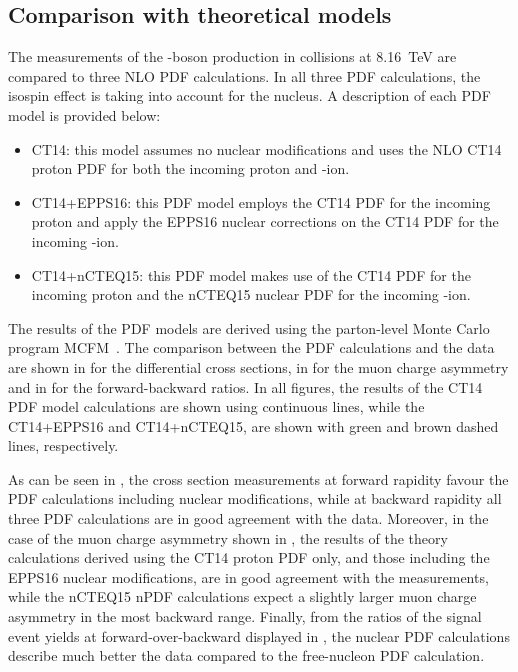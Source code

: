 \subsection{Comparison with theoretical models} \label{sec:WBoson_Results_ComparisonWithTheory}

The measurements of the \Wb-boson production in \RunpPb collisions at \SI{8.16}{\TeV} are compared to three NLO PDF calculations. In all three PDF calculations, the isospin effect is taking into account for the \Pb nucleus. A description of each PDF model is provided below:

\begin{itemize}

 \item CT14: this model assumes no nuclear modifications and uses the NLO CT14 proton PDF for both the incoming proton and \Pb-ion.

 \item CT14+EPPS16: this PDF model employs the CT14 PDF for the incoming proton and apply the EPPS16 nuclear corrections on the CT14 PDF for the incoming \Pb-ion.

 \item CT14+nCTEQ15: this PDF model makes use of the CT14 PDF for the incoming proton and the nCTEQ15 nuclear PDF for the incoming \Pb-ion.

\end{itemize}

The results of the PDF models are derived using the parton-level Monte Carlo program MCFM~\cite{MCFM}. The comparison between the PDF calculations and the data are shown in  for the \WToMuNu differential cross sections, in  for the muon charge asymmetry and in  for the forward-backward ratios. In all figures, the results of the CT14 PDF model calculations are shown using continuous lines, while the CT14+EPPS16 and CT14+nCTEQ15, are shown with green and brown dashed lines, respectively.

As can be seen in , the \WToMuNu cross section measurements at forward rapidity favour the PDF calculations including nuclear modifications, while at backward rapidity all three PDF calculations are in good agreement with the data. Moreover, in the case of the muon charge asymmetry shown in , the results of the theory calculations derived using the CT14 proton PDF only, and those including the EPPS16 nuclear modifications, are in good agreement with the measurements, while the nCTEQ15 nPDF calculations expect a slightly larger muon charge asymmetry in the most backward \etaMuCM range. Finally, from the ratios of the signal event yields at forward-over-backward \etaMuCM displayed in , the nuclear PDF calculations describe much better the data compared to the free-nucleon PDF calculation.

